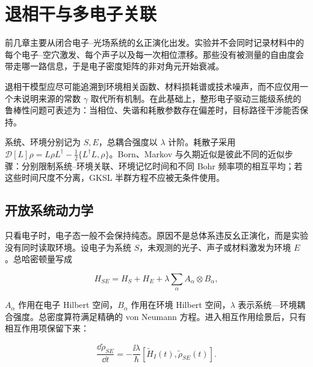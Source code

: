 \chapter{退相干与多电子关联}

前几章主要从闭合电子--光场系统的幺正演化出发。实验并不会同时记录材料中的每个电子--空穴激发、每个声子以及每一次相位漂移。那些没有被测量的自由度会带走哪一路信息，于是电子密度矩阵的非对角元开始衰减。

退相干模型应尽可能追溯到环境相关函数、材料损耗谱或技术噪声，而不应仅用一个未说明来源的常数 $\gamma$ 取代所有机制。在此基础上，整形电子驱动三能级系统的鲁棒性问题可表述为：当相位、失谐和耗散参数存在偏差时，目标路径干涉能否保持。

系统、环境分别记为 $S,E$，总耦合强度以 $\lambda$ 计阶。耗散子采用 $\mathcal D[L]\rho=L\rho L^\dagger-\tfrac12\{L^\dagger L,\rho\}$。Born、Markov 与久期近似是彼此不同的近似步骤：分别限制系统--环境关联、环境记忆时间和不同 Bohr 频率项的相互平均；若这些时间尺度不分离，GKSL 半群方程不应被无条件使用。


\section{开放系统动力学}
只看电子时，电子态一般不会保持纯态。原因不是总体系违反幺正演化，而是实验没有同时读取环境。设电子为系统 $S$，未观测的光子、声子或材料激发为环境 $E$。总哈密顿量写成

\begin{equation}
H_{SE}=H_S+H_E+\lambda\sum_\alpha A_\alpha\otimes B_\alpha,
\label{eq:ch05-1}
\end{equation}

$A_\alpha$ 作用在电子 Hilbert 空间，$B_\alpha$ 作用在环境 Hilbert 空间，$\lambda$ 表示系统—环境耦合强度。总密度算符满足精确的 von Neumann 方程。进入相互作用绘景后，只有相互作用项保留下来：

\begin{equation}
\frac{\dd \widetilde\rho_{SE}}{\dd t}=-\frac{\ii\lambda}{\hbar}[\widetilde H_I(t),\widetilde\rho_{SE}(t)].
\label{eq:ch05-2}
\end{equation}

